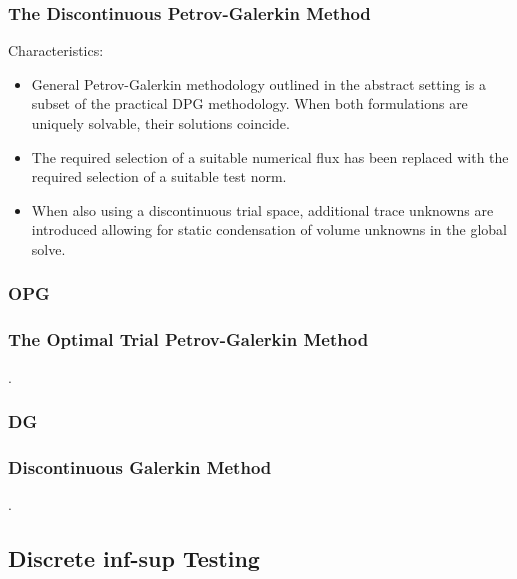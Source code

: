 \begin{frame}
\frametitle{The Discontinuous Petrov-Galerkin Method}

Characteristics:
\begin{itemize}
  \item General Petrov-Galerkin methodology outlined in the abstract setting is
    a subset of the practical DPG methodology. When both formulations are
    uniquely solvable, their solutions coincide.
  \item The required selection of a suitable numerical flux has been replaced
    with the required selection of a suitable test norm.
  \item When also using a discontinuous trial space, additional trace unknowns
    are introduced allowing for static condensation of volume unknowns in the
    global solve.
\end{itemize}

\end{frame}

\subsubsection{OPG}

\begin{frame}
\frametitle{The Optimal Trial Petrov-Galerkin Method}

.

\end{frame}

\subsubsection{DG}

\begin{frame}
\frametitle{Discontinuous Galerkin Method}

.

\end{frame}

\subsection{Discrete inf-sup Testing}
